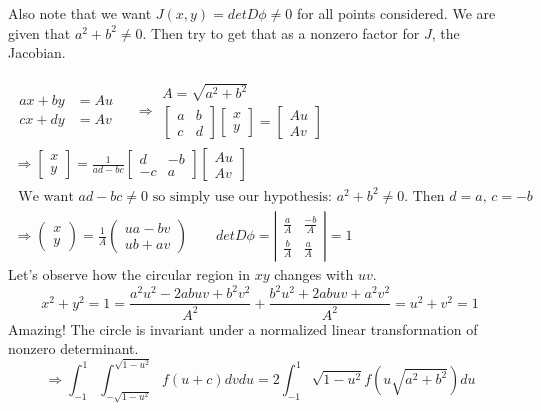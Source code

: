 \documentclass[twoside]{amsart}
\theoremstyle{plain}
\theoremstyle{definition}
\begin{document}
Also note that we want $J(x,y) = det{D\phi} \neq 0$ for all points considered.  We are given that $a^2 +b^2  \neq 0$.  Then try to get that as a nonzero factor for $J$, the Jacobian.  

\[
\begin{gathered}
  \begin{aligned} ax + by & = Au  \\ cx + dy & = Av \end{aligned} \quad \, \Longrightarrow \begin{gathered} A = \sqrt{ a^2 + b^2 } \\ \left[  \begin{matrix} a & b \\ c & d \end{matrix} \right] \left[ \begin{matrix} x \\ y \end{matrix} \right] = \left[ \begin{matrix} A u \\ A v \end{matrix} \right] \end{gathered} \\
  \Longrightarrow \left[ \begin{matrix} x \\ y \end{matrix} \right] = \frac{1}{ ad - bc} \left[ \begin{matrix} d & -b \\ -c & a \end{matrix} \right] \left[ \begin{matrix} A u \\ Av \end{matrix} \right]  \\
\text{ We want $ad-bc \neq 0 $ so simply use our hypothesis: $a^2 + b^2 \neq 0 $.  Then $d = a, \, c = -b$ } \\
\Longrightarrow \left( \begin{matrix} x \\ y \end{matrix} \right) = \frac{1}{A} \left( \begin{matrix} ua - bv \\ ub+av \end{matrix} \right) \quad \quad det{ D \phi} = \left| \begin{matrix} \frac{a}{A} & \frac{-b}{A} \\ \frac{b}{A} & \frac{a}{A}\end{matrix} \right| = 1 
\end{gathered}
\]
Let's observe how the circular region in $xy$ changes with $uv$.  
\[
x^2 + y^2 = 1 = \frac{ a^2 u ^2 - 2ab uv + b^2 v^2 }{ A^2} + \frac{ b^2 u ^2 + 2abuv + a^2 v^2 }{A^2} = u^2 + v^2 = 1
\]
Amazing!  The circle is invariant under a normalized linear transformation of nonzero determinant.  
\[
\Longrightarrow \int_{-1}^1 \int_{-\sqrt{ 1 - u^2}}^{ \sqrt{ 1 - u^2}} f(u+c) dv du = 2 \int_{-1}^1 \sqrt{ 1 - u^2 } f(u \sqrt{ a^2 + b^2 } )du 
\]
\end{document}
